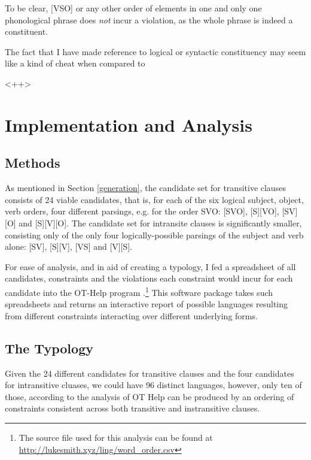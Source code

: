 \documentclass{article}
\begin{document}
To be clear, [VSO] or any other order of elements in one and only one phonological phrase does \emph{not} incur a violation, as the whole phrase is indeed a constituent.

\begin{framed}
The fact that I have made reference to logical or syntactic constituency may seem like a kind of cheat when compared to 
\end{framed}

<++>

\section{Implementation and Analysis}

\subsection{Methods}

As mentioned in Section \ref{generation}, the candidate set for transitive clauses consists of 24 viable candidates, that is, for each of the six logical subject, object, verb orders, four different parsings, e.g. for the order SVO: [SVO], [S][VO], [SV][O] and [S][V][O]. The candidate set for intransite clauses is significantly smaller, consisting only of the only four logically-possible parsings of the subject and verb alone: [SV], [S][V], [VS] and [V][S].

For ease of analysis, and in aid of creating a typology, I fed a spreadsheet of all candidates, constraints and the violations each constraint would incur for each candidate into the OT-Help program \parencite{othelp}.\footnote{The source file used for this analysis can be found at \href{http://lukesmith.xyz/ling/word_order.csv}{http://lukesmith.xyz/ling/word\_order.csv}} This software package takes such spreadsheets and returns an interactive report of possible languages resulting from different constraints interacting over different underlying forms.

\subsection{The Typology}

Given the 24 different candidates for transitive clauses and the four candidates for intransitive cluases, we could have 96 distinct languages, however, only ten of those, according to the analysis of OT Help can be produced by an ordering of constraints consistent across both transitive and instransitive clauses.
\end{document}
